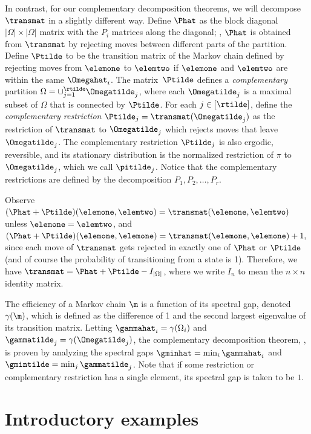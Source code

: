 In contrast, for our complementary decomposition theorems,
we will decompose $\transmat$ in a slightly different way.
Define $\Phat$ as the block diagonal $|\Omega|\times |\Omega|$ matrix 
with the $P_i$ matrices along the diagonal; \ie,  $\Phat$ is 
obtained from $\transmat$ by rejecting moves between different parts of 
the partition.
Define $\Ptilde$ to be the transition matrix of the 
Markov chain defined by rejecting moves from $\elemone$ to $\elemtwo$ 
if $\elemone$ and $\elemtwo$ are within the same $\Omegahat_i$.  
The matrix~$\Ptilde$ 
defines a \emph{complementary} partition $\Omega = \cup_{j=1}^{\rtilde} 
\Omegatilde_j$, where each $\Omegatilde_j$ is a maximal subset of 
$\Omega$ that is connected 
by $\Ptilde$. For each $j\in [\rtilde]$, define the \emph{complementary 
restriction} $\Ptilde_{j} = \transmat(\Omegatilde_j)$ as the 
restriction of $\transmat$ to $\Omegatilde_j$ which rejects moves that 
leave $\Omegatilde_j$. The complementary restriction $\Ptilde_j$ is 
also ergodic, reversible, and its stationary distribution is the normalized restriction 
of $\pi$ to $\Omegatilde_j$, which we call $\pitilde_j$.
Notice that 
the complementary restrictions are defined by the decomposition 
$P_1,P_2,\ldots, P_r$.

Observe $(\Phat+\Ptilde)(\elemone,\elemtwo)=\transmat(\elemone,\elemtwo)$ 
unless $\elemone=\elemtwo$, and 
$(\Phat+\Ptilde)(\elemone,\elemone)=\transmat(\elemone,\elemone)+1,$ 
since each move of $\transmat$ gets rejected in exactly one of $\Phat$ 
or $\Ptilde$ (and of course the probability of transitioning from a 
state is 1).  Therefore, we have $\transmat = 
\Phat+\Ptilde-I_{|\Omega|}$, where we write $I_n$ to 
mean the $n \times n$ identity matrix. 

The efficiency of a Markov chain $\m$ is a function of its spectral 
gap, denoted $\gamma(\m)$, which is defined as the difference of 1 and 
the second largest eigenvalue of its transition matrix. Letting 
$\gammahat_i = \gamma(\Omega_i)$ and $\gammatilde_j = 
\gamma(\Omegatilde_j)$, the complementary decomposition theorem, 
, is proven by analyzing the spectral 
gaps $\gminhat=\min_i \gammahat_i$ and $\gmintilde=\min_j 
\gammatilde_j$.  Note that if some restriction or complementary 
restriction has a single element, its spectral gap is taken to be $1$.

\section{Introductory examples}\label{sec:decompThm} 

